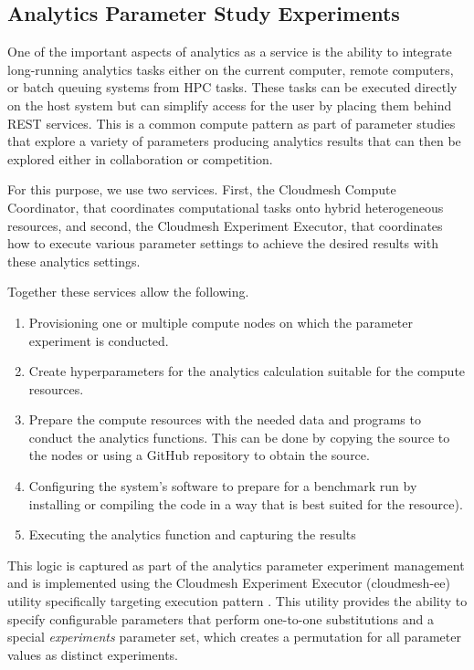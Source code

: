 \subsection{Analytics Parameter Study Experiments}

One of the important aspects of analytics as a service is the ability to integrate long-running analytics tasks either 
on the current computer, remote computers, or batch queuing systems from HPC tasks. These tasks can be 
executed directly on the host system but can simplify access for the user by placing them behind REST 
services. This is a common compute pattern as part of parameter studies that explore a variety of 
parameters producing analytics results that can then be explored either in collaboration or competition. 

For this purpose, we use two services. First, the Cloudmesh Compute Coordinator, that coordinates computational tasks onto hybrid heterogeneous resources, and second, the Cloudmesh Experiment Executor, that coordinates how to execute various parameter settings to achieve the desired results with these analytics settings.

Together these services allow the following.

\begin{enumerate}
    \item Provisioning one or multiple compute nodes on which the parameter experiment is conducted.
    \item Create hyperparameters for the analytics calculation suitable for the compute resources.
    \item Prepare the compute resources with the needed data and programs to conduct the analytics 
          functions. This can be done by copying the source to the nodes or using a GitHub repository to 
          obtain the source.
    \item Configuring the system's software to prepare for a benchmark run by installing or compiling the code 
          in a way that is best suited for the resource).
    \item Executing the analytics function and capturing the results
\end{enumerate}

This logic is captured as part of the analytics parameter experiment management and is implemented using the Cloudmesh Experiment Executor (cloudmesh-ee) utility specifically targeting execution pattern \cite{repo-cloudmesh-ee}.
This utility provides the ability to specify configurable parameters that perform one-to-one substitutions and a special \textit{experiments} parameter set, which creates a permutation for all parameter values as distinct experiments.

